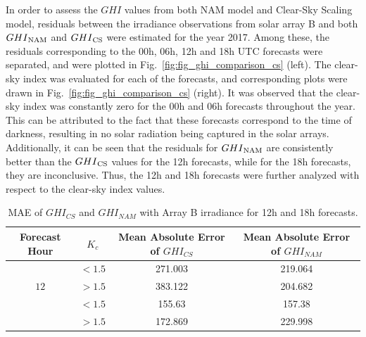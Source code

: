\par In order to assess the $GHI$ values from both NAM model and Clear-Sky Scaling model, residuals between the irradiance observations from solar array B and both $GHI\textsubscript{NAM}$ and $GHI\textsubscript{CS}$ were estimated for the year 2017. Among these, the residuals corresponding to the 00h, 06h, 12h and 18h UTC forecasts were separated, and were plotted in Fig.~\ref{fig:fig_ghi_comparison_cs} (left). The clear-sky index was evaluated for each of the forecasts, and corresponding plots were drawn in Fig.~\ref{fig:fig_ghi_comparison_cs} (right). It was observed that the clear-sky index was constantly zero for the 00h and 06h forecasts throughout the year. This can be attributed to the fact that these forecasts correspond to the time of darkness, resulting in no solar radiation being captured in the solar arrays. Additionally, it can be seen that the residuals for $GHI\textsubscript{NAM}$ are consistently better than the $GHI\textsubscript{CS}$ values for the 12h forecasts, while for the 18h forecasts, they are inconclusive. Thus, the 12h and 18h forecasts were further analyzed with respect to the clear-sky index values.

\begin{table}[h]
\begin{center}
    \caption{MAE of $GHI_{CS}$ and $GHI_{NAM}$ with Array B irradiance for 12h and 18h forecasts.}
    \label{Tab:mean_absolute_residual}
    \begin{tabular}{ c c c c }
    	\toprule
    	\textbf{\parbox{2cm}{\centering Forecast Hour}} & \boldmath\textbf{$K_c$} & \textbf{\parbox{4.5cm}{\centering Mean Absolute Error of \boldmath$GHI_{CS}$}} & \textbf{\parbox{4.5cm}{\centering Mean Absolute Error of \boldmath$GHI_{NAM}$}}\\
    	\midrule
    	\multirow{3}{4em}{$12$} & $< 1.5$ & 271.003 & 219.064 \\ &
    	$> 1.5$ & 383.122 & 204.682 \\
    	\midrule
    	\multirow{3}{4em}{$18$} & $< 1.5$ & 155.63 & 157.38 \\ &
    	$> 1.5$ & 172.869 & 229.998 \\
    	\bottomrule
    \end{tabular}
\end{center}
\end{table}

